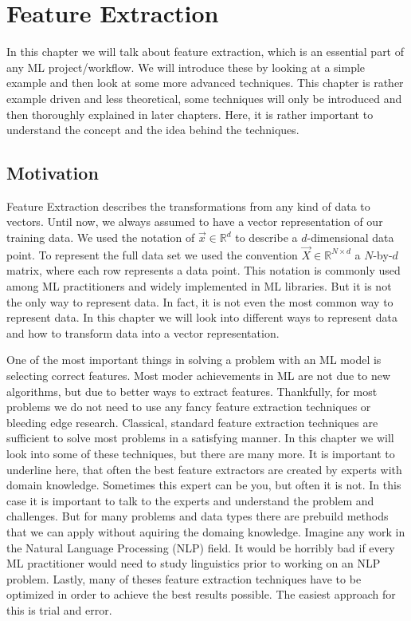 \chapter{Feature Extraction}
\label{ch:feature-extraction}
In this chapter we will talk about feature extraction, which is an essential part of any ML project/workflow.
We will introduce these by looking at a simple example and then look at some more advanced techniques.
This chapter is rather example driven and less theoretical, some techniques will only be introduced and then thoroughly explained in later chapters.
Here, it is rather important to understand the concept and the idea behind the techniques.

\section{Motivation}
Feature Extraction describes the transformations from any kind of data to vectors.
Until now, we always assumed to have a vector representation of our training data.
We used the notation of $\vec{x} \in \mathbb{R}^d$ to describe a $d$-dimensional data point.
To represent the full data set we used the convention $\vec{X} \in \mathbb{R}^{N \times d}$ 
a $N$-by-$d$ matrix, where each row represents a data point. This notation is commonly used among ML practitioners
and widely implemented in ML libraries. But it is not the only way to represent data. In fact, it is not even the most common way to represent data.
In this chapter we will look into different ways to represent data and how to transform data into a vector representation.

One of the most important things in solving a problem with an ML model is selecting correct features.
Most moder achievements in ML are not due to new algorithms, but due to better ways to extract features.
Thankfully, for most problems we do not need to use any fancy feature extraction techniques or bleeding edge research.
Classical, standard feature extraction techniques are sufficient to solve most problems in a satisfying manner.
In this chapter we will look into some of these techniques, but there are many more.
It is important to underline here, that often the best feature extractors are created by experts with domain knowledge.
Sometimes this expert can be you, but often it is not. In this case it is important to talk to the experts and understand the problem and challenges.
But for many problems and data types there are prebuild methods that we can apply without aquiring the domaing knowledge.
Imagine any work in the Natural Language Processing (NLP) field. It would be horribly bad if every ML practitioner would need to study linguistics prior
to working on an NLP problem.
Lastly, many of theses feature extraction techniques have to be optimized in order to achieve the best results possible. The easiest approach for this is trial and error.

